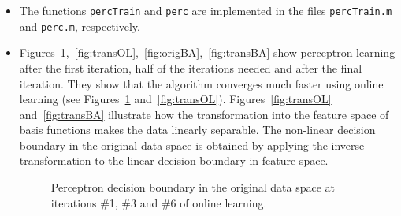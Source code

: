 \documentclass[a4]{article}
\begin{document}
\begin{itemize}
\item The functions \texttt{percTrain} and \texttt{perc} are implemented in the files \texttt{percTrain.m} and \texttt{perc.m}, respectively.

\item Figures~\ref{fig:origOL},~\ref{fig:transOL},~\ref{fig:origBA},~\ref{fig:transBA} show perceptron learning after the first iteration, half of the iterations needed and after the final iteration. They show that the algorithm converges much faster using online learning (see Figures~\ref{fig:origOL} and~\ref{fig:transOL}). Figures~\ref{fig:transOL} and~\ref{fig:transBA} illustrate how the transformation into the feature space of basis functions makes the data linearly separable. The non-linear decision boundary in the original data space is obtained by applying the inverse transformation to the linear decision boundary in feature space.
\begin{figure}[h!]
\centering
\caption{Perceptron decision boundary in the original data space at iterations \#1, \#3 and \#6 of online learning.}
\label{fig:origOL}

\end{figure}
\end{itemize}
\end{document}
